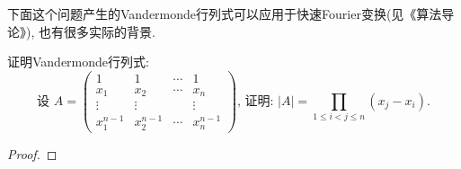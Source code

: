 下面这个问题产生的Vandermonde行列式可以应用于快速Fourier变换(见《算法导论》), 也有很多实际的背景. 

\begin{prob} 
    证明Vandermonde行列式: 
    $$
    \text { 设 } A=\left(\begin{array}{cccc}
        1 & 1 & \cdots & 1 \\
        x_{1} & x_{2} & \cdots & x_{n} \\
        \vdots & \vdots & & \vdots \\
        x_{1}^{n-1} & x_{2}^{n-1} & \cdots & x_{n}^{n-1}
        \end{array}\right) \text {, 证明: }|A|=\prod_{1 \leqslant i<j \leqslant n}\left(x_{j}-x_{i}\right) \text {. } 
    $$
\end{prob} 

\begin{proof}
\end{proof}